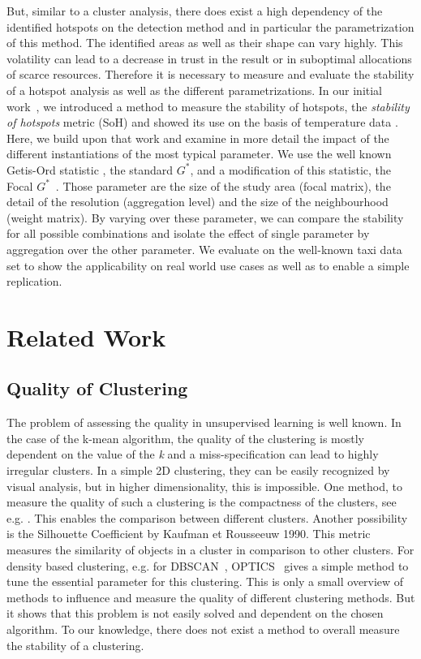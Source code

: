 \documentclass{itatnew}
\begin{document}
But, similar to a cluster analysis, there does exist a high dependency of the identified hotspots on the detection method and in particular the parametrization of this method. The identified areas as well as their shape can vary highly. This volatility can lead to a decrease in trust in the result or in suboptimal allocations of scarce resources. Therefore it is necessary to measure and evaluate the stability of a hotspot analysis as well as the different parametrizations. 
In our initial work~\cite{SoH-GI-Forum}, we introduced a method to measure the stability of hotspots, the \emph{stability of hotspots} metric (SoH) and showed its use on the basis of temperature data .   
Here, we build upon that work and examine in more detail the impact of the 
different instantiations of the most typical parameter. We use the well known 
Getis-Ord statistic \cite{Ord.1995}, the standard $G^*$, and a modification of 
this statistic, the Focal $G^*$~\cite{SoH-GI-Forum}. Those parameter are the 
size of the study area (focal matrix), the detail of the resolution 
(aggregation level) and the size of the neighbourhood (weight matrix). By 
varying over these parameter, we can compare the stability for all possible 
combinations and isolate the effect of single parameter by aggregation over the 
other parameter. 
We evaluate on the well-known taxi data set to show the applicability on real world use cases as well as to enable a simple replication. 


\section{Related Work}

\subsection{Quality of Clustering}
The problem of assessing the quality in unsupervised learning is well known. In the case of the k-mean algorithm, the quality of the clustering is mostly dependent on the value of the \emph{k} and a miss-specification can lead to highly irregular clusters. In a simple 2D clustering, they can be easily recognized by visual analysis, but in higher dimensionality, this is impossible. One method, to measure the quality of such a clustering is the compactness of the clusters, see e.g. \cite{CompactnessDataClustering}. This enables the comparison between different clusters. Another possibility is the Silhouette Coefficient by Kaufman et Rousseeuw 1990. This metric measures the similarity of objects in a cluster in comparison to other clusters. For density based clustering, e.g. for DBSCAN~\cite{Ester96adensity-based}, OPTICS~\cite{Ankerst:1999:OOP:304181.304187} gives a simple method to tune the essential parameter for this clustering. This is only a small overview of methods to influence and measure the quality of different clustering methods. But it shows that this problem is not easily solved and dependent on the chosen algorithm. To our knowledge, there does not exist a method to overall measure the stability of a clustering.
\end{document}
